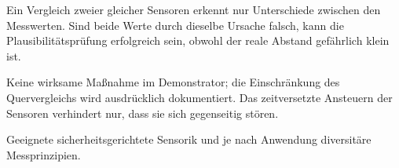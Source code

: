 Ein Vergleich zweier gleicher Sensoren erkennt nur Unterschiede zwischen den
Messwerten. Sind beide Werte durch dieselbe Ursache falsch, kann die
Plausibilitätsprüfung erfolgreich sein, obwohl der reale Abstand gefährlich
klein ist.

Keine wirksame Maßnahme im Demonstrator; die Einschränkung des
Quervergleichs wird ausdrücklich dokumentiert. Das zeitversetzte Ansteuern der
Sensoren verhindert nur, dass sie sich gegenseitig stören.

Geeignete sicherheitsgerichtete Sensorik und je nach Anwendung diversitäre
Messprinzipien.
